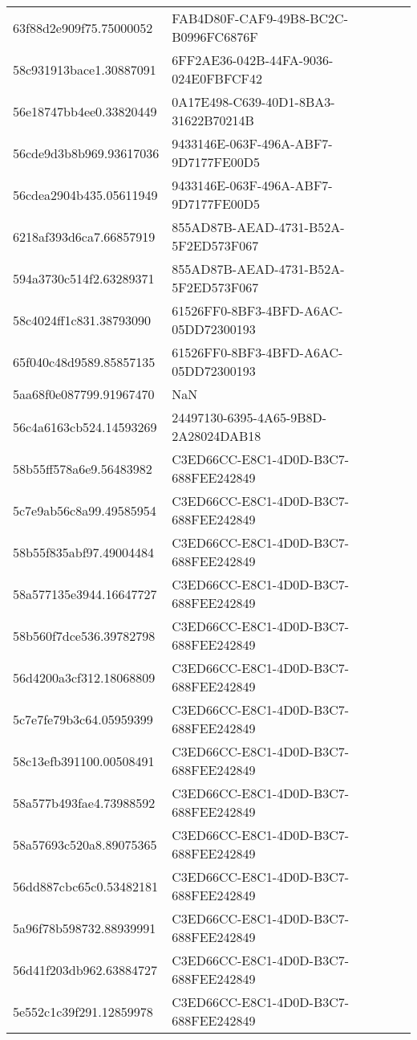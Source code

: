 \begin{tabular}{ll}
63f88d2e909f75.75000052 & FAB4D80F-CAF9-49B8-BC2C-B0996FC6876F \\
58c931913bace1.30887091 & 6FF2AE36-042B-44FA-9036-024E0FBFCF42 \\
56e18747bb4ee0.33820449 & 0A17E498-C639-40D1-8BA3-31622B70214B \\
56cde9d3b8b969.93617036 & 9433146E-063F-496A-ABF7-9D7177FE00D5 \\
56cdea2904b435.05611949 & 9433146E-063F-496A-ABF7-9D7177FE00D5 \\
6218af393d6ca7.66857919 & 855AD87B-AEAD-4731-B52A-5F2ED573F067 \\
594a3730c514f2.63289371 & 855AD87B-AEAD-4731-B52A-5F2ED573F067 \\
58c4024ff1c831.38793090 & 61526FF0-8BF3-4BFD-A6AC-05DD72300193 \\
65f040c48d9589.85857135 & 61526FF0-8BF3-4BFD-A6AC-05DD72300193 \\
5aa68f0e087799.91967470 & NaN \\
56c4a6163cb524.14593269 & 24497130-6395-4A65-9B8D-2A28024DAB18 \\
58b55ff578a6e9.56483982 & C3ED66CC-E8C1-4D0D-B3C7-688FEE242849 \\
5c7e9ab56c8a99.49585954 & C3ED66CC-E8C1-4D0D-B3C7-688FEE242849 \\
58b55f835abf97.49004484 & C3ED66CC-E8C1-4D0D-B3C7-688FEE242849 \\
58a577135e3944.16647727 & C3ED66CC-E8C1-4D0D-B3C7-688FEE242849 \\
58b560f7dce536.39782798 & C3ED66CC-E8C1-4D0D-B3C7-688FEE242849 \\
56d4200a3cf312.18068809 & C3ED66CC-E8C1-4D0D-B3C7-688FEE242849 \\
5c7e7fe79b3c64.05959399 & C3ED66CC-E8C1-4D0D-B3C7-688FEE242849 \\
58c13efb391100.00508491 & C3ED66CC-E8C1-4D0D-B3C7-688FEE242849 \\
58a577b493fae4.73988592 & C3ED66CC-E8C1-4D0D-B3C7-688FEE242849 \\
58a57693c520a8.89075365 & C3ED66CC-E8C1-4D0D-B3C7-688FEE242849 \\
56dd887cbc65c0.53482181 & C3ED66CC-E8C1-4D0D-B3C7-688FEE242849 \\
5a96f78b598732.88939991 & C3ED66CC-E8C1-4D0D-B3C7-688FEE242849 \\
56d41f203db962.63884727 & C3ED66CC-E8C1-4D0D-B3C7-688FEE242849 \\
5e552c1c39f291.12859978 & C3ED66CC-E8C1-4D0D-B3C7-688FEE242849 \\

\end{tabular}

